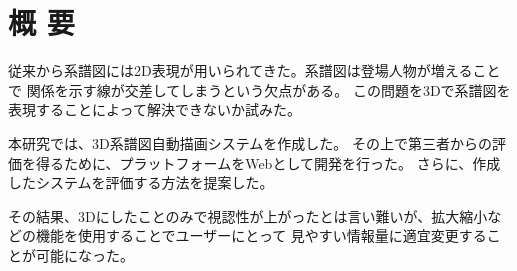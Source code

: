 \section*{\center 概 要}
従来から系譜図には2D表現が用いられてきた。系譜図は登場人物が増えることで
関係を示す線が交差してしまうという欠点がある。
この問題を3Dで系譜図を表現することによって解決できないか試みた。

本研究では、3D系譜図自動描画システムを作成した。
その上で第三者からの評価を得るために、プラットフォームをWebとして開発を行った。
さらに、作成したシステムを評価する方法を提案した。

その結果、3Dにしたことのみで視認性が上がったとは言い難いが、拡大縮小などの機能を使用することでユーザーにとって
見やすい情報量に適宜変更することが可能になった。

